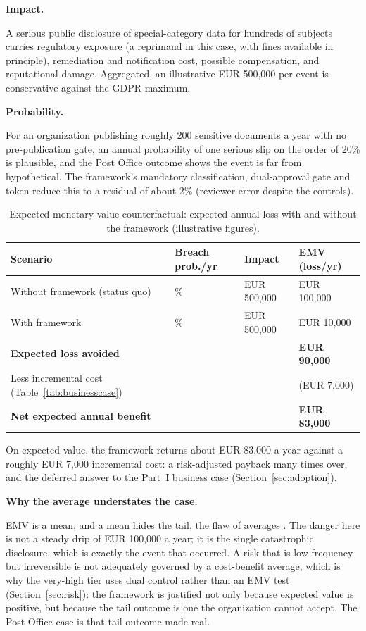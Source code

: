 \documentclass[12pt,a4paper]{article}
\begin{document}
\noindent\textbf{Impact.}\par
A serious public disclosure of special-category data for hundreds of subjects carries regulatory exposure (a reprimand in this case, with fines available in principle), remediation and notification cost, possible compensation, and reputational damage. Aggregated, an illustrative EUR 500,000 per event is conservative against the GDPR maximum.

\noindent\textbf{Probability.}\par
For an organization publishing roughly 200 sensitive documents a year with no pre-publication gate, an annual probability of one serious slip on the order of 20\% is plausible, and the Post Office outcome shows the event is far from hypothetical. The framework's mandatory classification, dual-approval gate and token reduce this to a residual of about 2\% (reviewer error despite the controls).

\begin{table}[H]
\centering
\small
{}
\begin{tabular}{@{} p{5.6cm} >{\centering\arraybackslash}p{2.6cm} >{\raggedleft\arraybackslash}p{2.4cm} >{\raggedleft\arraybackslash}p{2.6cm} @{}}
\toprule
\textbf{\color{accentdark}Scenario} & \textbf{\color{accentdark}Breach prob./yr} & \textbf{\color{accentdark}Impact} & \textbf{\color{accentdark}EMV (loss/yr)} \\
\midrule
Without framework (status quo) & 20\% & EUR 500,000 & EUR 100,000 \\
With framework & 2\% & EUR 500,000 & EUR 10,000 \\
\textbf{Expected loss avoided} & & & \textbf{EUR 90,000} \\
Less incremental cost (Table~\ref{tab:businesscase}) & & & (EUR 7,000) \\
\textbf{Net expected annual benefit} & & & \textbf{EUR 83,000} \\
\bottomrule
\end{tabular}
\caption{Expected-monetary-value counterfactual: expected annual loss with and without the framework (illustrative figures).}
\label{tab:emv}
\end{table}

On expected value, the framework returns about EUR 83,000 a year against a roughly EUR 7,000 incremental cost: a risk-adjusted payback many times over, and the deferred answer to the Part~I business case (Section~\ref{sec:adoption}).

\noindent\textbf{Why the average understates the case.}\par
EMV is a mean, and a mean hides the tail, the flaw of averages \cite{falchi_slides}. The danger here is not a steady drip of EUR 100,000 a year; it is the single catastrophic disclosure, which is exactly the event that occurred. A risk that is low-frequency but irreversible is not adequately governed by a cost-benefit average, which is why the very-high tier uses dual control rather than an EMV test (Section~\ref{sec:risk}): the framework is justified not only because expected value is positive, but because the tail outcome is one the organization cannot accept. The Post Office case is that tail outcome made real.
\end{document}
